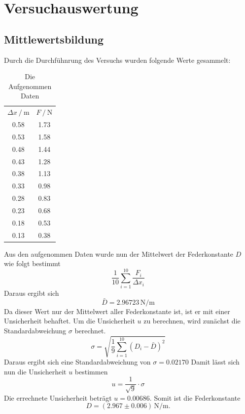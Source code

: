   \section{Versuchauswertung}
  \subsection{Mittlewertsbildung}
Durch die Durchfühnrung des Versuchs wurden folgende Werte gesammelt:
\begin{table}
  \centering
  \caption{Die Aufgenommen Daten}
  \label{tab:Messdaten}
  \begin{tabular}{c c}
  \toprule
  $ \Delta x \:/\: \si{\meter}$ & $F \:/\: \si{\newton}$ \\
  0.58 & 1.73 \\
  0.53 & 1.58 \\
  0.48 & 1.44 \\
  0.43 & 1.28 \\
  0.38 & 1.13 \\
  0.33 & 0.98 \\
  0.28 & 0.83 \\
  0.23 & 0.68 \\
  0.18 & 0.53 \\
  0.13 & 0.38 \\
  \bottomrule
  \end{tabular}
\end{table}
\FloatBarrier
Aus den aufgenommen Daten wurde nun der Mittelwert der Federkonstante $D$ wie folgt bestimmt
\begin{equation}
\frac{1}{10} \sum_{i=1}^{10} \frac{F_i}{\Delta x_i}
\end{equation}
Daraus ergibt sich
\begin{equation}
\bar{D} = 2.96723 \,\mathrm{N/m}
\end{equation}
Da dieser Wert nur der Mittelwert aller Federkonstante ist, ist er mit einer Unsicherheit behaftet.
Um die Unsicherheit $u$ zu berechnen, wird zunächst die Standardabweichung $\sigma$ berechnet.
\begin{equation}
\sigma = \sqrt{\frac{1}{9} \sum_{i=1}^{10} (D_i - \bar{D})^2}
\end{equation}
Daraus ergibt sich eine Standardabweichung von $\sigma = 0.02170$
Damit lässt sich nun die Unsicherheit $u$ bestimmen
\begin{equation}
u = \frac{1}{ \sqrt{9}} \cdot \sigma
\end{equation}
Die errechnete Unsicherheit beträgt $u = 0.00686$.
Somit ist die Federkonstante 
\begin{equation}
D = (2.967 \pm 0.006)\,\mathrm{N/m}.
\end{equation}
\newpage
